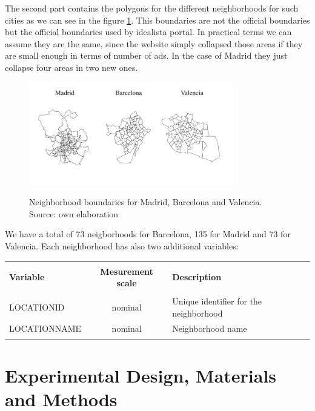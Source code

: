 \documentclass[times,final]{elsarticle}
\begin{document}
The second part contains the polygons for the different neighborhoods for such cities as we can see in the figure \ref{fig:all-polygons}. This boundaries are not the official boundaries but the official boundaries used by idealista portal. In practical terms we can assume they are the same, since the website simply collapsed those areas if they are small enough in terms of number of ads. In the case of Madrid they just collapse four areas in two new ones.

\begin{figure}[h]
  \caption{Neighborhood boundaries for Madrid, Barcelona and Valencia. Source: own elaboration}
  \centering
  \includegraphics[height=4.5cm]{figures/idealista18-all-polygons}
  \label{fig:all-polygons}
\end{figure}

We have a total of 73 neigborhoods for Barcelona, 135 for Madrid and 73 for Valencia. Each neighborhood has also two additional variables:

\begin{footnotesize}
\begin{longtable}{p{40mm} c p{63mm}}
\hline
\hline
& &\\
\textbf{Variable} & \textbf{Mesurement scale} & \textbf{Description}\\
\hline
& &\\
LOCATIONID & nominal & Unique identifier for the neighborhood \\
LOCATIONNAME & nominal & Neighborhood name \\
& &\\
\hline
\end{longtable}
\end{footnotesize}

\section*{Experimental Design, Materials and Methods}
\end{document}
